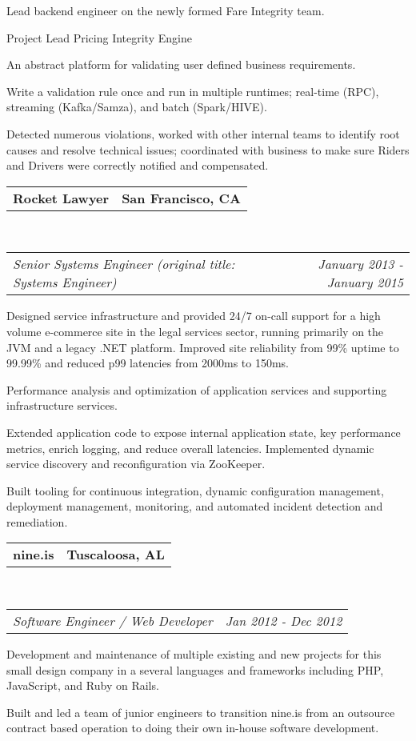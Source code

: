 \documentclass[10pt,letterpaper]{article}
\makeatletter
\newcommand{\headerrow}[2]
{\begin{tabular*}{\linewidth}{l@{\extracolsep{\fill}}r}
	#1 &
	#2 \\
\end{tabular*}}
\newcommand{\employment}[5]{
	\headerrow
		{\textbf{#1}}
		{\textbf{#2}}
	\\
	\headerrow
		{\emph{#3}}
		{\emph{#4}}
	\begin{itemize*}
		\item #5
	\end{itemize*}
}
\makeatother
\begin{document}
{    \item Lead backend engineer on the newly formed Fare Integrity team.
  \item [Project Lead] Pricing Integrity Engine
    \item An abstract platform for validating user defined business requirements.
    \item Write a validation rule once and run in multiple runtimes; real-time (RPC), streaming (Kafka/Samza), and batch (Spark/HIVE).
    \item Detected numerous violations, worked with other internal teams to identify root causes and resolve technical issues; coordinated with business to make sure Riders and Drivers were correctly notified and compensated.
}
\employment{Rocket Lawyer}{San Francisco, CA}{Senior Systems Engineer (original
  title: Systems Engineer)}{January 2013 - January 2015}{
Designed service infrastructure and provided 24/7 on-call support for a high
volume e-commerce site in the legal services sector, running primarily on the
JVM and a legacy .NET platform. Improved site reliability from 99\% uptime to 99.99\%
and reduced p99 latencies from 2000ms to 150ms.
\item Performance analysis and optimization of application services and supporting infrastructure services.
\item Extended application code to expose internal application
  state, key performance metrics, enrich logging, and reduce overall latencies.
  Implemented dynamic service discovery and reconfiguration via ZooKeeper.
\item Built tooling for continuous integration, dynamic configuration
  management, deployment management, monitoring, and automated incident
  detection and remediation.
}

\employment{nine.is}{Tuscaloosa, AL}{Software Engineer / Web Developer}{Jan 2012 - Dec 2012}{
Development and maintenance of multiple existing and new projects for this small design company in a several languages and frameworks including PHP, JavaScript, and Ruby on Rails.
\item Built and led a team of junior engineers to transition nine.is from an
  outsource contract based operation to doing their own in-house software development.
}
\end{document}
